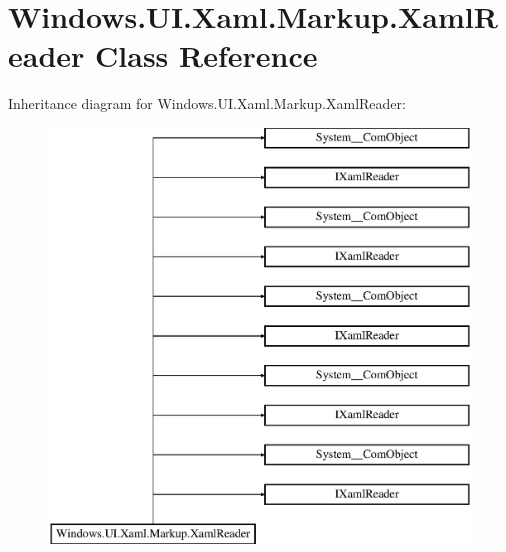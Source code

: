 \hypertarget{class_windows_1_1_u_i_1_1_xaml_1_1_markup_1_1_xaml_reader}{}\section{Windows.\+U\+I.\+Xaml.\+Markup.\+Xaml\+Reader Class Reference}
\label{class_windows_1_1_u_i_1_1_xaml_1_1_markup_1_1_xaml_reader}
Inheritance diagram for Windows.\+U\+I.\+Xaml.\+Markup.\+Xaml\+Reader\+:\begin{figure}[H]
\begin{center}
\leavevmode
\includegraphics[height=11.000000cm]{class_windows_1_1_u_i_1_1_xaml_1_1_markup_1_1_xaml_reader}
\end{center}
\end{figure}
